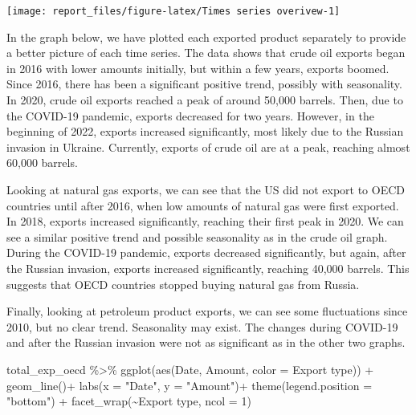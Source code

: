 \documentclass[
]{article}
\newenvironment{Shaded}{\begin{snugshade}}{\end{snugshade}}
\newcommand{\AttributeTok}[1]{\textcolor[rgb]{0.77,0.63,0.00}{#1}}
\newcommand{\DecValTok}[1]{\textcolor[rgb]{0.00,0.00,0.81}{#1}}
\newcommand{\FunctionTok}[1]{\textcolor[rgb]{0.00,0.00,0.00}{#1}}
\newcommand{\NormalTok}[1]{#1}
\newcommand{\SpecialCharTok}[1]{\textcolor[rgb]{0.00,0.00,0.00}{#1}}
\newcommand{\StringTok}[1]{\textcolor[rgb]{0.31,0.60,0.02}{#1}}
\begin{document}
\begin{center}\texttt{[image: report\_files/figure-latex/Times series overivew-1]} \end{center}

In the graph below, we have plotted each exported product separately to
provide a better picture of each time series. The data shows that crude
oil exports began in 2016 with lower amounts initially, but within a few
years, exports boomed. Since 2016, there has been a significant positive
trend, possibly with seasonality. In 2020, crude oil exports reached a
peak of around 50,000 barrels. Then, due to the COVID-19 pandemic,
exports decreased for two years. However, in the beginning of 2022,
exports increased significantly, most likely due to the Russian invasion
in Ukraine. Currently, exports of crude oil are at a peak, reaching
almost 60,000 barrels.

Looking at natural gas exports, we can see that the US did not export to
OECD countries until after 2016, when low amounts of natural gas were
first exported. In 2018, exports increased significantly, reaching their
first peak in 2020. We can see a similar positive trend and possible
seasonality as in the crude oil graph. During the COVID-19 pandemic,
exports decreased significantly, but again, after the Russian invasion,
exports increased significantly, reaching 40,000 barrels. This suggests
that OECD countries stopped buying natural gas from Russia.

Finally, looking at petroleum product exports, we can see some
fluctuations since 2010, but no clear trend. Seasonality may exist. The
changes during COVID-19 and after the Russian invasion were not as
significant as in the other two graphs.

\begin{Shaded}
\begin{Highlighting}[]
\NormalTok{total\_exp\_oecd }\SpecialCharTok{\%\textgreater{}\%}  
  \FunctionTok{ggplot}\NormalTok{(}\FunctionTok{aes}\NormalTok{(Date, Amount, }\AttributeTok{color =} \StringTok{\textasciigrave{}}\AttributeTok{Export type}\StringTok{\textasciigrave{}}\NormalTok{)) }\SpecialCharTok{+}
  \FunctionTok{geom\_line}\NormalTok{()}\SpecialCharTok{+}
  \FunctionTok{labs}\NormalTok{(}\AttributeTok{x =} \StringTok{"Date"}\NormalTok{, }\AttributeTok{y =} \StringTok{"Amount"}\NormalTok{)}\SpecialCharTok{+}
  \FunctionTok{theme}\NormalTok{(}\AttributeTok{legend.position =} \StringTok{"bottom"}\NormalTok{) }\SpecialCharTok{+}
  \FunctionTok{facet\_wrap}\NormalTok{(}\SpecialCharTok{\textasciitilde{}}\StringTok{\textasciigrave{}}\AttributeTok{Export type}\StringTok{\textasciigrave{}}\NormalTok{, }\AttributeTok{ncol =} \DecValTok{1}\NormalTok{)}
\end{Highlighting}
\end{Shaded}
\end{document}
